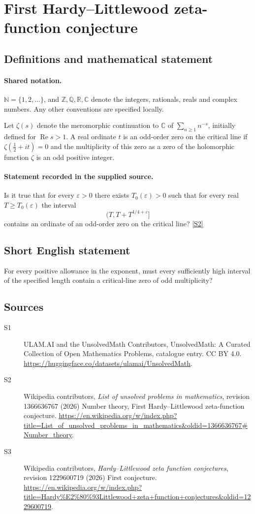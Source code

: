 \documentclass[11pt]{article}
\newcommand{\sref}[2]{\hyperlink{source:#1:#2}{[S#2]}}
\begin{document}
\section{First Hardy–Littlewood zeta-function conjecture}\label{statement}

\subsection{Definitions and mathematical statement}

\paragraph{Shared notation.}$\mathbb N=\{1,2,\ldots\}$, and $\mathbb Z,\mathbb Q,\mathbb R,\mathbb C$ denote the integers, rationals, reals and complex numbers. Any other conventions are specified locally.


Let $\zeta(s)$ denote the meromorphic continuation to $\mathbb C$ of $\sum_{n\ge1}n^{-s}$, initially defined for $\operatorname{Re}s>1$. A real ordinate $t$ is an odd-order zero on the critical line if $\zeta(\tfrac12+it)=0$ and the multiplicity of this zero as a zero of the holomorphic function $\zeta$ is an odd positive integer.
\paragraph{Statement recorded in the supplied source.}
Is it true that for every $\varepsilon>0$ there exists $T_0(\varepsilon)>0$ such that for every real $T\ge T_0(\varepsilon)$ the interval
\[\bigl(T,T+T^{1/4+\varepsilon}\bigr]\]
contains an ordinate of an odd-order zero on the critical line? \sref{statement}{2}
\subsection{Short English statement}
For every positive allowance in the exponent, must every sufficiently high interval of the specified length contain a critical-line zero of odd multiplicity?
\subsection{Sources}
\begin{description}
\item[\hypertarget{source:statement:1}{S1}] ULAM.AI and the UnsolvedMath Contributors, UnsolvedMath: A Curated Collection of Open Mathematics Problems, catalogue entry. CC BY 4.0. \url{https://huggingface.co/datasets/ulamai/UnsolvedMath}.
\item[\hypertarget{source:statement:2}{S2}] Wikipedia contributors, \emph{List of unsolved problems in mathematics}, revision 1366636767 (2026) Number theory, First Hardy–Littlewood zeta-function conjecture. \url{https://en.wikipedia.org/w/index.php?title=List_of_unsolved_problems_in_mathematics&oldid=1366636767#Number_theory}.
\item[\hypertarget{source:statement:3}{S3}] Wikipedia contributors, \emph{Hardy–Littlewood zeta function conjectures}, revision 1229600719 (2026) First conjecture. \url{https://en.wikipedia.org/w/index.php?title=Hardy%E2%80%93Littlewood+zeta+function+conjectures&oldid=1229600719}.
\end{description}
\label{end:statement}
\end{document}
